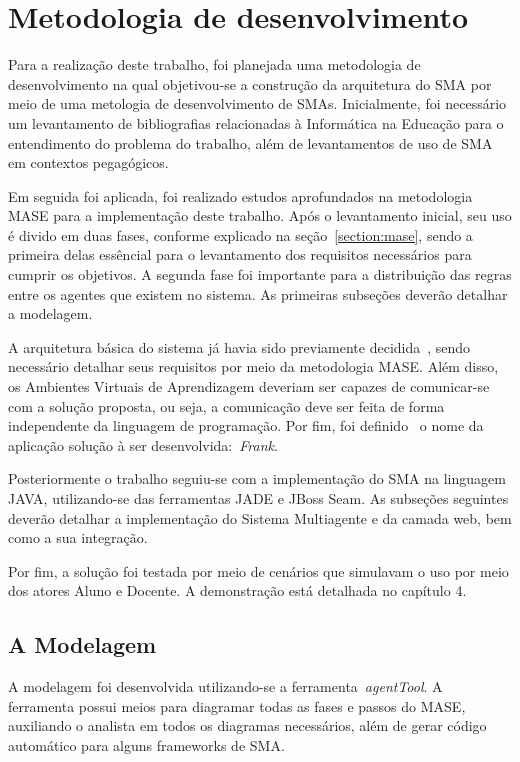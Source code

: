 \chapter{Metodologia de desenvolvimento}

Para a realização deste trabalho, foi planejada uma metodologia de desenvolvimento na qual objetivou-se a construção da arquitetura do SMA por meio de uma metologia de desenvolvimento de SMAs. Inicialmente, foi necessário um levantamento de bibliografias relacionadas à Informática na Educação para o entendimento do problema do trabalho, além de levantamentos de uso de SMA em contextos pegagógicos.

Em seguida foi aplicada, foi realizado estudos aprofundados na metodologia MASE para a implementação deste trabalho. Após o levantamento inicial, seu uso é divido em duas fases, conforme explicado na seção~\ref{section:mase}, sendo a primeira delas essêncial para o levantamento dos requisitos necessários para cumprir os objetivos. A segunda fase foi importante para a distribuição das regras entre os agentes que existem no sistema. As primeiras subseções deverão detalhar a modelagem.

A arquitetura básica do sistema já havia sido previamente decidida~\cite{editalFrank}, sendo necessário detalhar seus requisitos por meio da metodologia MASE. Além disso, os Ambientes Virtuais de Aprendizagem deveriam ser capazes de comunicar-se com a solução proposta, ou seja, a comunicação deve ser feita de forma independente da linguagem de programação. Por fim, foi definido~\cite{editalFrank} o nome da aplicação solução à ser desenvolvida:~\emph{Frank}.

Posteriormente o trabalho seguiu-se com a implementação do SMA na linguagem JAVA, utilizando-se das ferramentas JADE e JBoss Seam. As subseções seguintes deverão detalhar a implementação do Sistema Multiagente e da camada web, bem como a sua integração.

Por fim, a solução foi testada por meio de cenários que simulavam o uso por meio dos atores Aluno e Docente. A demonstração está detalhada no capítulo 4.

\section{A Modelagem}

A modelagem foi desenvolvida utilizando-se a ferramenta~\emph{agentTool}. A ferramenta possui meios para diagramar todas as fases e passos do MASE, auxiliando o analista em todos os diagramas necessários, além de gerar código automático para alguns frameworks de SMA.

